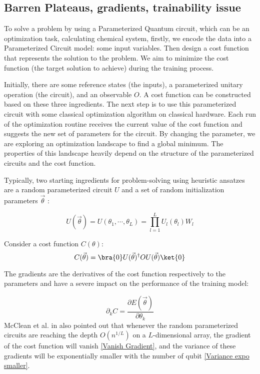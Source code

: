 \subsection{Barren Plateaus, gradients, trainability issue}

To solve a problem by using a Parameterized Quantum circuit, which can be an optimization task, calculating chemical system, firstly, we encode the data into a Parameterized Circuit model: some input variables. 
Then design a cost function that represents the solution to the problem. We aim to minimize the cost function (the target solution to achieve) during the training process.

Initially, there are some reference states (the inputs), a parameterized unitary operation (the circuit), and an observable $O$.
A cost function can be constructed based on these three ingredients.
The next step is to use this parameterized circuit with some classical optimization algorithm on classical hardware.
Each run of the optimization routine receives the current value of the cost function and suggests the new set of parameters for the circuit.
By changing the parameter, we are exploring an optimization landscape to find a global minimum.
The properties of this landscape heavily depend on the structure of the parameterized circuits and the cost function.

Typically, two starting ingredients for problem-solving using heuristic ansatzes are a random parameterized circuit $U$ and a set of random initialization parameters $\vec{\theta}$ \cite{mccleanBarrenPlateausQuantum2018}:

\begin{equation}\label{Parameterized Circuit}
    U(\vec{\theta})
    = U(\theta_1, \cdots, \theta_L)
    = \prod_{l=1}^L U_l(\theta_l)W_l
\end{equation}

Consider a cost function $C(\theta)$:
\begin{equation}\label{Cost function}
    C(\vec{\theta})
    = \bra{0} U(\vec{\theta})^\dagger OU(\vec{\theta}) \ket{0}
\end{equation}

The gradients are the derivatives of the cost function respectively to the parameters and have a severe impact on the performance of the training model:

\begin{equation}
    \partial_k C = \frac{\partial E(\vec{\theta})}{\partial\theta_k}
\end{equation}
McClean et al. in \cite{mccleanBarrenPlateausQuantum2018} also pointed out that whenever the random parameterized circuits are reaching the depth $O(n^{1/L})$ on a $L$-dimensional array, the gradient of the cost function will vanish \ref{Vanish Gradient}, and the variance of these gradients will be exponentially smaller with the number of qubit \ref{Variance expo smaller}. 

